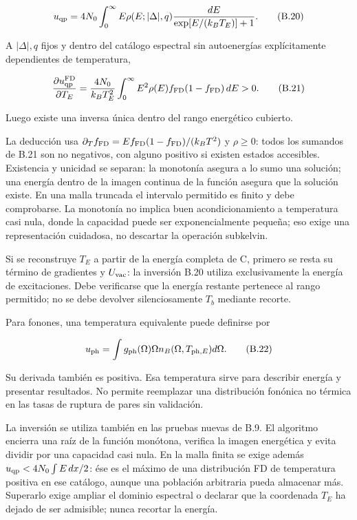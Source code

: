 \documentclass[
  spanish,
  10pt,
  a4paper,
]{article}
\newcounter{none} %
\begin{document}
\[
u_{\rm qp}=4N_0\int_0^\infty
E\rho(E;|\Delta|,q)\frac{dE}{\exp[E/(k_BT_E)]+1}.
\tag{B.20}
\]

A \(|\Delta|,q\) fijos y dentro del catálogo espectral sin autoenergías
explícitamente dependientes de temperatura,

\[
\frac{\partial u_{\rm qp}^{\rm FD}}{\partial T_E}
=\frac{4N_0}{k_BT_E^2}\int_0^\infty
E^2\rho(E)f_{\rm FD}(1-f_{\rm FD})\,dE>0. \tag{B.21}
\]

Luego existe una inversa única dentro del rango energético cubierto.

La deducción usa
\(\partial_T f_{\rm FD}=E f_{\rm FD}(1-f_{\rm FD})/(k_BT^2)\) y
\(\rho\geq0\): todos los sumandos de B.21 son no negativos, con alguno
positivo si existen estados accesibles. Existencia y unicidad se
separan: la monotonía asegura a lo sumo una solución; una energía dentro
de la imagen continua de la función asegura que la solución existe. En
una malla truncada el intervalo permitido es finito y debe comprobarse.
La monotonía no implica buen acondicionamiento a temperatura casi nula,
donde la capacidad puede ser exponencialmente pequeña; eso exige una
representación cuidadosa, no descartar la operación subkelvin.

Si se reconstruye \(T_E\) a partir de la energía completa de C, primero
se resta su término de gradientes y \(U_{\rm vac}\): la inversión B.20
utiliza exclusivamente la energía de excitaciones. Debe verificarse que
la energía restante pertenece al rango permitido; no se debe devolver
silenciosamente \(T_b\) mediante recorte.

Para fonones, una temperatura equivalente puede definirse por

\[
u_{\rm ph}=\int g_{\rm ph}(\Omega)\Omega n_B(\Omega,T_{{\rm ph},E})d\Omega.
\tag{B.22}
\]

Su derivada también es positiva. Esa temperatura sirve para describir
energía y presentar resultados. No permite reemplazar una distribución
fonónica no térmica en las tasas de ruptura de pares sin validación.

La inversión se utiliza también en las pruebas nuevas de B.9. El
algoritmo encierra una raíz de la función monótona, verifica la imagen
energética y evita dividir por una capacidad casi nula. En la malla
finita se exige además \(u_{\rm qp}<4N_0\int E\,dx/2\): ése es el máximo
de una distribución FD de temperatura positiva en ese catálogo, aunque
una población arbitraria pueda almacenar más. Superarlo exige ampliar el
dominio espectral o declarar que la coordenada \(T_E\) ha dejado de ser
admisible; nunca recortar la energía.
\end{document}
